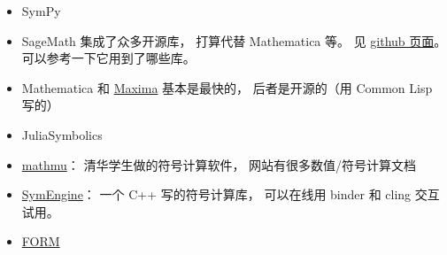 
\begin{issues}
\issueDraft
\end{issues}

\begin{itemize}
\item SymPy
\item SageMath 集成了众多开源库， 打算代替 Mathematica 等。 见 \href{https://github.com/sagemath/sage/}{github 页面}。 可以参考一下它用到了哪些库。
\item Mathematica 和 \href{https://maxima.sourceforge.io/}{Maxima} 基本是最快的， 后者是开源的（用 Common Lisp 写的）
\item JuliaSymbolics
\item \href{http://mathmu.github.io/MTCAS/RecentChanges.html}{mathmu}： 清华学生做的符号计算软件， 网站有很多数值/符号计算文档
\item \href{https://github.com/symengine/symengine}{SymEngine}： 一个 C++ 写的符号计算库， 可以在线用 binder 和 cling 交互试用。
\item \href{https://www.nikhef.nl/~form/}{FORM}
\end{itemize}
